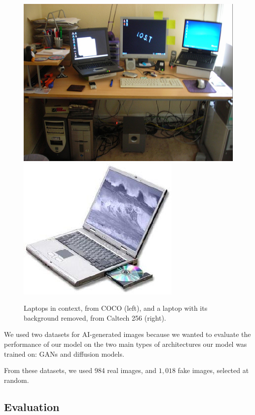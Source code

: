 \documentclass{article} %
\begin{document}
\begin{figure}[h]
    \begin{center}
        \includegraphics[scale=0.3]{figs/coco_laptop.jpg}
        \includegraphics[scale=0.45]{figs/caltech_laptop.jpg}
    \end{center}
    \caption{Laptops in context, from COCO (left), and a laptop with its background removed, from Caltech 256 (right).}
    \label{fig:coco_vs_caltech}
\end{figure}

We used two datasets for AI-generated images because we wanted to evaluate the performance of our model on the two main types of architectures our model was trained on: GANs and diffusion models.

From these datasets, we used 984 real images, and $1,018$ fake images, selected at random.

\subsection{Evaluation}
\end{document}
